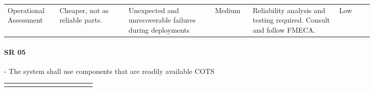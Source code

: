\begin{landscape}
{\begin{longtable}{| p{0.12\linewidth} | p{0.16\linewidth} |  p{0.20\linewidth} | p{0.08\linewidth} | p{0.20\linewidth} | p{0.08\linewidth} |}
	\hline
	Operational \newline Assessment & Cheaper, not as reliable parts. & Unexpected and unrecoverable failures during deployments & \cellcolor{yellow} Medium & Reliability analysis and testing required. \newline Consult and follow FMECA. & \cellcolor{green} Low
	\label{tab:sr04_feasibility}
\end{longtable}
}
\newpage




\paragraph*{SR 05} - The system shall use components that are readily available COTS

{\fontsize{8pt}{8pt}\selectfont
\begin{longtable}{| p{0.12\linewidth} | p{0.16\linewidth} |  p{0.20\linewidth} | p{0.08\linewidth} | p{0.20\linewidth} | p{0.08\linewidth} |}
	\hline \endlastfoot
	

\end{longtable}}
\end{landscape}
